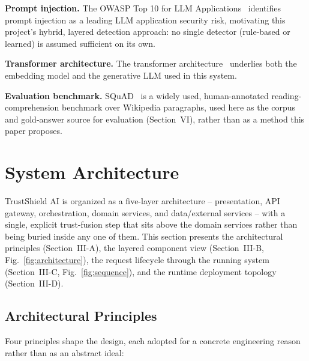 \documentclass[conference]{IEEEtran}
\begin{document}
\textbf{Prompt injection.} The OWASP Top 10 for LLM Applications~\cite{owasp_llm}
identifies prompt injection as a leading LLM application security risk, motivating this
project's hybrid, layered detection approach: no single detector (rule-based or
learned) is assumed sufficient on its own.

\textbf{Transformer architecture.} The transformer architecture~\cite{vaswani2017attention}
underlies both the embedding model and the generative LLM used in this system.

\textbf{Evaluation benchmark.} SQuAD~\cite{rajpurkar2016squad} is a widely used,
human-annotated reading-comprehension benchmark over Wikipedia paragraphs, used here as
the corpus and gold-answer source for evaluation (Section~VI), rather than as a method
this paper proposes.

\section{System Architecture}

TrustShield AI is organized as a five-layer architecture -- presentation, API gateway,
orchestration, domain services, and data/external services -- with a single, explicit
trust-fusion step that sits above the domain services rather than being buried inside
any one of them. This section presents the architectural principles (Section~III-A),
the layered component view (Section~III-B, Fig.~\ref{fig:architecture}), the request
lifecycle through the running system (Section~III-C, Fig.~\ref{fig:sequence}), and the
runtime deployment topology (Section~III-D).

\subsection{Architectural Principles}

Four principles shape the design, each adopted for a concrete engineering reason rather
than as an abstract ideal:
\end{document}
